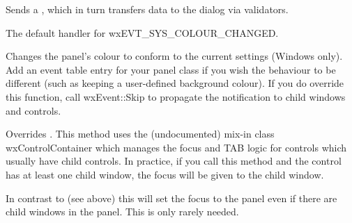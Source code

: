 
Sends a , which
in turn transfers data to the dialog via validators.



\label{wxpanelonsyscolourchanged}


The default handler for wxEVT\_SYS\_COLOUR\_CHANGED.




Changes the panel's colour to conform to the current settings (Windows only).
Add an event table entry for your panel class if you wish the behaviour
to be different (such as keeping a user-defined
background colour). If you do override this function, call wxEvent::Skip to
propagate the notification to child windows and controls.




\label{wxpanelsetfocus}


Overrides . This method
uses the (undocumented) mix-in class wxControlContainer which manages
the focus and TAB logic for controls which usually have child controls.
In practice, if you call this method and the control has at least
one child window, the focus will be given to the child window.




\label{wxpanelsetfocusignoringchildren}


In contrast to  (see above)
this will set the focus to the panel even if there are child windows
in the panel. This is only rarely needed.



